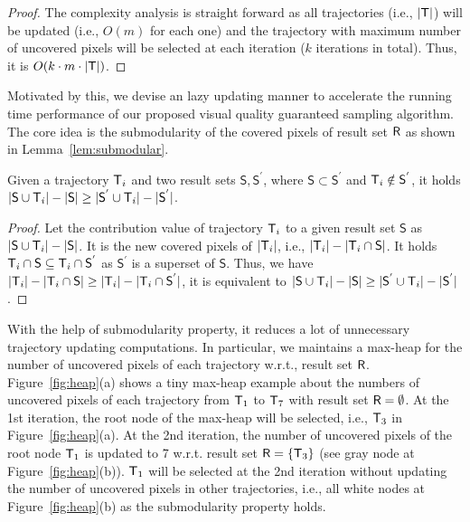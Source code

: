 \begin{proof}
The complexity analysis is straight forward as all trajectories (i.e., $|\mathsf{T}|$) will be updated (i.e., $O(m)$ for each one) and the trajectory with maximum number of uncovered pixels will be selected at each iteration ($k$ iterations in total). Thus, it is  $O(k \cdot m \cdot |\mathsf{T}|)$.
\end{proof}

Motivated by this, we devise an lazy updating manner to accelerate the running time performance of our proposed visual quality guaranteed sampling algorithm.
The core idea is the submodularity of the covered pixels of result set $\mathsf{R}$ as shown in Lemma~\ref{lem:submodular}.

\begin{lemma}[Submodularity]\label{lem:submodular}
Given a trajectory $\mathsf{T}_i$ and two result sets $\mathsf{S},\mathsf{S}^{'}$, where $\mathsf{S} \subset \mathsf{S}^{'}$ and $\mathsf{T}_i \notin \mathsf{S}^{'}$,
it holds $|\mathsf{S} \cup \mathsf{T}_i| - |\mathsf{S}| \geq |\mathsf{S}^{'} \cup \mathsf{T}_i| - |\mathsf{S}^{'}|$.
\end{lemma}

\begin{proof}
Let the contribution value of trajectory $\mathsf{T}_i$ to a given result set $\mathsf{S}$ as $|\mathsf{S} \cup \mathsf{T}_i| - |\mathsf{S}|$.
It is the new covered pixels of $|\mathsf{T}_i|$, i.e., $|\mathsf{T}_i| - |\mathsf{T}_i \cap \mathsf{S}|$.
It holds $\mathsf{T}_i \cap \mathsf{S} \subseteq  \mathsf{T}_i \cap \mathsf{S}^{'}$ as $\mathsf{S}^{'}$ is a superset of $\mathsf{S}$.
Thus, we have $|\mathsf{T}_i| - |\mathsf{T}_i \cap \mathsf{S}| \geq |\mathsf{T}_i| - |\mathsf{T}_i \cap \mathsf{S}^{'}|$,
it is equivalent to $|\mathsf{S} \cup \mathsf{T}_i| - |\mathsf{S}| \geq |\mathsf{S}^{'} \cup \mathsf{T}_i| - |\mathsf{S}^{'}|$.
\end{proof}

With the help of submodularity property, it reduces a lot of unnecessary trajectory updating computations.
In particular, we maintains a max-heap for the number of uncovered pixels of each trajectory w.r.t., result set $\mathsf{R}$.
Figure~\ref{fig:heap}(a) shows a tiny max-heap example about the numbers of uncovered pixels of each trajectory from $\mathsf{T}_1$ to $\mathsf{T}_7$ with result set $\mathsf{R}=\emptyset$.
At the 1st iteration, the root node of the max-heap will be selected, i.e., $\mathsf{T}_3$ in Figure~\ref{fig:heap}(a).
At the 2nd iteration, the number of uncovered pixels of the root node $\mathsf{T}_1$ is updated to 7 w.r.t. result set $\mathsf{R} = \{\mathsf{T}_3 \}$ (see gray node at Figure~\ref{fig:heap}(b)).
$\mathsf{T}_1$ will be selected at the 2nd iteration without updating the number of uncovered pixels in other trajectories, i.e., all white nodes at Figure~\ref{fig:heap}(b) as the submodularity property holds.


